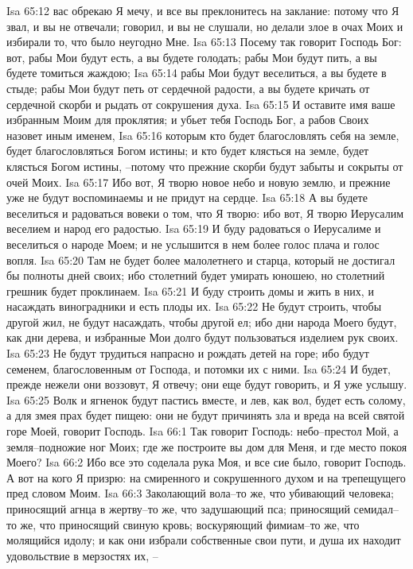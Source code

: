 Isa 65:12  вас обрекаю Я мечу, и все вы преклонитесь на заклание: потому что Я звал, и вы не отвечали; говорил, и вы не слушали, но делали злое в очах Моих и избирали то, что было неугодно Мне.
Isa 65:13  Посему так говорит Господь Бог: вот, рабы Мои будут есть, а вы будете голодать; рабы Мои будут пить, а вы будете томиться жаждою;
Isa 65:14  рабы Мои будут веселиться, а вы будете в стыде; рабы Мои будут петь от сердечной радости, а вы будете кричать от сердечной скорби и рыдать от сокрушения духа.
Isa 65:15  И оставите имя ваше избранным Моим для проклятия; и убьет тебя Господь Бог, а рабов Своих назовет иным именем,
Isa 65:16  которым кто будет благословлять себя на земле, будет благословляться Богом истины; и кто будет клясться на земле, будет клясться Богом истины, --потому что прежние скорби будут забыты и сокрыты от очей Моих.
Isa 65:17  Ибо вот, Я творю новое небо и новую землю, и прежние уже не будут воспоминаемы и не придут на сердце.
Isa 65:18  А вы будете веселиться и радоваться вовеки о том, что Я творю: ибо вот, Я творю Иерусалим веселием и народ его радостью.
Isa 65:19  И буду радоваться о Иерусалиме и веселиться о народе Моем; и не услышится в нем более голос плача и голос вопля.
Isa 65:20  Там не будет более малолетнего и старца, который не достигал бы полноты дней своих; ибо столетний будет умирать юношею, но столетний грешник будет проклинаем.
Isa 65:21  И буду строить домы и жить в них, и насаждать виноградники и есть плоды их.
Isa 65:22  Не будут строить, чтобы другой жил, не будут насаждать, чтобы другой ел; ибо дни народа Моего будут, как дни дерева, и избранные Мои долго будут пользоваться изделием рук своих.
Isa 65:23  Не будут трудиться напрасно и рождать детей на горе; ибо будут семенем, благословенным от Господа, и потомки их с ними.
Isa 65:24  И будет, прежде нежели они воззовут, Я отвечу; они еще будут говорить, и Я уже услышу.
Isa 65:25  Волк и ягненок будут пастись вместе, и лев, как вол, будет есть солому, а для змея прах будет пищею: они не будут причинять зла и вреда на всей святой горе Моей, говорит Господь.
Isa 66:1  Так говорит Господь: небо--престол Мой, а земля--подножие ног Моих; где же построите вы дом для Меня, и где место покоя Моего?
Isa 66:2  Ибо все это соделала рука Моя, и все сие было, говорит Господь. А вот на кого Я призрю: на смиренного и сокрушенного духом и на трепещущего пред словом Моим.
Isa 66:3  Заколающий вола--то же, что убивающий человека; приносящий агнца в жертву--то же, что задушающий пса; приносящий семидал--то же, что приносящий свиную кровь; воскуряющий фимиам--то же, что молящийся идолу; и как они избрали собственные свои пути, и душа их находит удовольствие в мерзостях их, --
